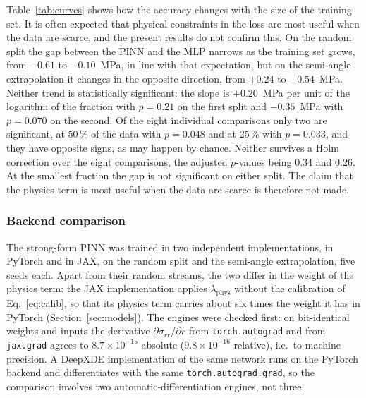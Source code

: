 \documentclass[pdflatex,sn-basic,Numbered]{sn-jnl}
\begin{document}
Table~\ref{tab:curves} shows how the accuracy changes with the size of the training set. It is often expected that physical constraints in the loss are most useful when the data are scarce, and the present results do not confirm this. On the random split the gap between the PINN and the MLP narrows as the training set grows, from $-0.61$ to $-0.10$~MPa, in line with that expectation, but on the semi-angle extrapolation it changes in the opposite direction, from $+0.24$ to $-0.54$~MPa. Neither trend is statistically significant: the slope is $+0.20$~MPa per unit of the logarithm of the fraction with $p=0.21$ on the first split and $-0.35$~MPa with $p=0.070$ on the second. Of the eight individual comparisons only two are significant, at 50\,\% of the data with $p=0.048$ and at 25\,\% with $p=0.033$, and they have opposite signs, as may happen by chance. Neither survives a Holm correction over the eight comparisons, the adjusted $p$-values being 0.34 and 0.26. At the smallest fraction the gap is not significant on either split. The claim that the physics term is most useful when the data are scarce is therefore not made.

\subsubsection{Backend comparison}
\label{sec:res_backend}

The strong-form PINN was trained in two independent implementations, in PyTorch and in JAX, on the random split and the semi-angle extrapolation, five seeds each. Apart from their random streams, the two differ in the weight of the physics term: the JAX implementation applies $\lambda_{\mathrm{phys}}$ without the calibration of Eq.~\eqref{eq:calib}, so that its physics term carries about six times the weight it has in PyTorch (Section~\ref{sec:models}). The engines were checked first: on bit-identical weights and inputs the derivative $\partial\sigma_{rr}/\partial r$ from \texttt{torch.autograd} and from \texttt{jax.grad} agrees to $8.7\times10^{-15}$ absolute ($9.8\times10^{-16}$ relative), i.e.\ to machine precision. A DeepXDE implementation \citep{lu2021} of the same network runs on the PyTorch backend and differentiates with the same \texttt{torch.autograd.grad}, so the comparison involves two automatic-differentiation engines, not three.
\end{document}
